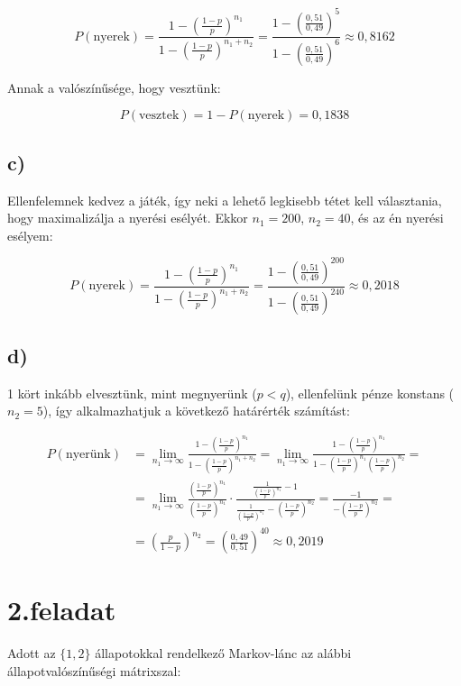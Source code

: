 \documentclass[a4paper,12pt]{article}
\begin{document}
\[
P(\textrm{nyerek}) = 
\frac{1 - \left( \frac{1-p}{p} \right)^{n_1}}
{1 - \left( \frac{1-p}{p} \right)^{n_1 + n_2}} = 
\frac{1 - \left( \frac{0,51}{0,49} \right)^{5}}
{1 - \left( \frac{0,51}{0,49} \right)^{6}} \approx 0,8162
\]

Annak a valószínűsége, hogy vesztünk:

\[
P(\textrm{vesztek}) = 1 - P(\textrm{nyerek}) = 0,1838
\]

\subsection*{c)}
Ellenfelemnek kedvez a játék, így neki a lehető legkisebb tétet kell
választania, hogy maximalizálja a nyerési esélyét. 
Ekkor $n_1 = 200$, $n_2 = 40$, és az én nyerési esélyem:

\[
P(\textrm{nyerek}) = 
\frac{1 - \left( \frac{1-p}{p} \right)^{n_1}}
{1 - \left( \frac{1-p}{p} \right)^{n_1 + n_2}} = 
\frac{1 - \left( \frac{0,51}{0,49} \right)^{200}}
{1 - \left( \frac{0,51}{0,49} \right)^{240}} \approx 0,2018
\]

\subsection*{d)}
1 kört inkább elvesztünk, mint megnyerünk ($p < q$), ellenfelünk pénze
konstans ($n_2 = 5$), így alkalmazhatjuk a következő határérték számítást:

\[
\begin{split}
P(\text{nyerünk}) &= 
\lim_{n_1 \to \infty} \frac{1-\left(\frac{1-p}{p}\right)^{n_1}}
{1-\left(\frac{1-p}{p}\right)^{n_1+n_2}} =
\lim_{n_1 \to \infty} \frac{1-\left(\frac{1-p}{p}\right)^{n_1}}
{1-\left(\frac{1-p}{p}\right)^{n_1}\left(\frac{1-p}{p}\right)^{n_2}} =\\
&= \lim_{n_1 \to \infty} \frac{\left(\frac{1-p}{p}\right)^{n_1}}
{\left(\frac{1-p}{p}\right)^{n_1}} \cdot 
\frac{\frac{1}{\left(\frac{1-p}{p}\right)^{n_1}}-1}
{\frac{1}{\left(\frac{1-p}{p}\right)^{n_1}} -
\left(\frac{1-p}{p}\right)^{n_2}} 
= \frac{-1}{-\left(\frac{1-p}{p}\right)^{n_2}} =\\
&= \left(\frac{p}{1-p}\right)^{n_2} = 
\left(\frac{0,49}{0,51}\right)^{40} \approx 0,2019
\end{split}
\]

\section*{2.feladat}
Adott az $\{1, 2\}$ állapotokkal rendelkező Markov-lánc 
az alábbi állapotvalószínűségi mátrixszal:
\end{document}
